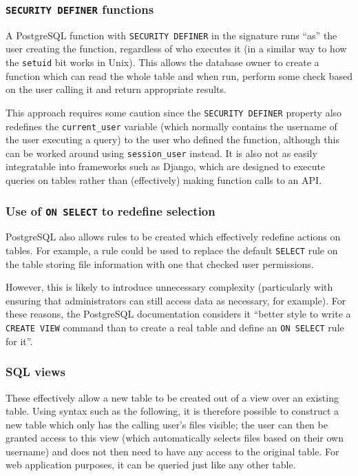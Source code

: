 \documentclass{article}
\begin{document}
\subsubsection{\texttt{SECURITY DEFINER} functions}
A PostgreSQL function with \texttt{SECURITY DEFINER} in the signature runs ``as'' the user creating the function, regardless of who executes it\cite{postgres-SEC_DEF} (in a similar way to how the \texttt{setuid} bit works in Unix). This allows the database owner to create a function which can read the whole table and when run, perform some check based on the user calling it and return appropriate results.

This approach requires some caution since the \texttt{SECURITY DEFINER} property also redefines the \verb+current_user+ variable (which normally contains the username of the user executing a query) to the user who defined the function, although this can be worked around using \verb+session_user+ instead. It is also not as easily integratable into frameworks such as Django, which are designed to execute queries on tables rather than (effectively) making function calls to an API.

\subsubsection{Use of \texttt{ON SELECT} to redefine selection}
PostgreSQL also allows rules to be created which effectively redefine actions on tables. For example, a rule could be used to replace the default \texttt{SELECT} rule on the table storing file information with one that checked user permissions.

However, this is likely to introduce unnecessary complexity (particularly with ensuring that administrators can still access data as necessary, for example). For these reasons, the PostgreSQL documentation considers it ``better style to write a \texttt{CREATE VIEW} command than to create a real table and define an \texttt{ON SELECT} rule for it''\cite{postgres-CREATE_RULE}.

\subsubsection{SQL views}
These effectively allow a new table to be created out of a view over an existing table. Using syntax such as the following, it is therefore possible to construct a new table which only has the calling user's files visible; the user can then be granted access to this view (which automatically selects files based on their own username) and does not then need to have any access to the original table. For web application purposes, it can be queried just like any other table.
\end{document}
